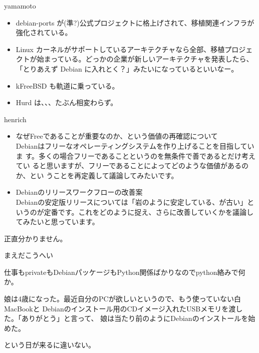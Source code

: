 \begin{prework}{ yamamoto }


\begin{itemize}
\item debian-ports が(準?)公式プロジェクトに格上げされて、移植関連インフラが強化されている。
\item Linux カーネルがサポートしているアーキテクチャなら全部、移植プロジェクトが始まっている。どっかの企業が新しいアーキテクチャを発表したら、「とりあえず Debian に入れとく？」みたいになっているといいなー。
\item kFreeBSD も軌道に乗っている。
\item Hurd は、、、たぶん相変わらず。
\end{itemize}

\end{prework}

\begin{prework}{ henrich }


\begin{itemize}
\item なぜFreeであることが重要なのか、という価値の再確認について\\
 Debianはフリーなオペレーティングシステムを作り上げることを目指していま
す。多くの場合フリーであることというのを無条件で善であるとだけ考えてい
ると思いますが、フリーであることによってどのような価値があるのか、とい
うことを再定義して議論してみたいです。
\item Debianのリリースワークフローの改善案\\
Debianの安定版リリースについては「岩のように安定している、が古い」というのが定番です。これをどのように捉え、さらに改善していくかを議論してみたいと思っています。
\end{itemize}


正直分かりません。

\end{prework}

\begin{prework}{ まえだこうへい }


仕事もprivateもDebianパッケージもPython関係ばかりなのでpython絡みで何か。


娘は4歳になった。最近自分のPCが欲しいというので、もう使っていない白MacBookと
Debianのインストール用のCDイメージ入れたUSBメモリを渡した。「ありがとう」と言って、
娘は当たり前のようにDebianのインストールを始めた。

という日が来るに違いない。
\end{prework}

